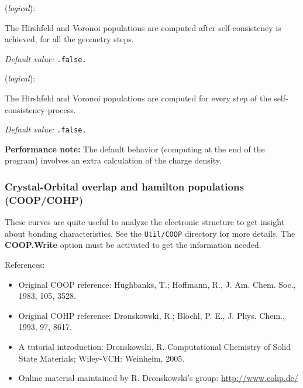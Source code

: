 \begin{description}
\itemsep 10pt
\parsep 0pt

\item[\textbf{PartialChargesAtEveryGeometry}] (\textit{logical}):

The Hirshfeld and Voronoi populations are computed after
self-consistency is achieved, for all the geometry steps.

\textit{Default value:} \texttt{.false.}

\item[\textbf{PartialChargesAtEveryScfStep}] (\textit{logical}):

The Hirshfeld and Voronoi populations are computed for every
step of the self-consistency process.

\textit{Default value:} \texttt{.false.}

\end{description}

\textbf{Performance note:}
The default behavior (computing at the end of the program) involves
an extra calculation of the charge density.
%


\subsubsection{Crystal-Orbital overlap and hamilton populations (COOP/COHP)}
\label{sec:coop}

These curves are quite useful to analyze the electronic structure to
get insight about bonding characteristics. See the \texttt{Util/COOP}
directory for more details. The \textbf{COOP.Write} option must be
activated to get the information needed.

References:

\begin{itemize}
\item Original COOP reference:
Hughbanks, T.; Hoffmann, R., J. Am. Chem. Soc., 1983, 105, 3528.
\item Original COHP reference: Dronskowski, R.; Blöchl, P. E., J. Phys. Chem., 1993, 97, 8617.
\item A tutorial introduction: Dronskowski, R. Computational Chemistry of Solid State
Materials; Wiley-VCH: Weinheim, 2005.
\item Online material maintained by R. Dronskowski's group: \url{http://www.cohp.de/}
\end{itemize}

